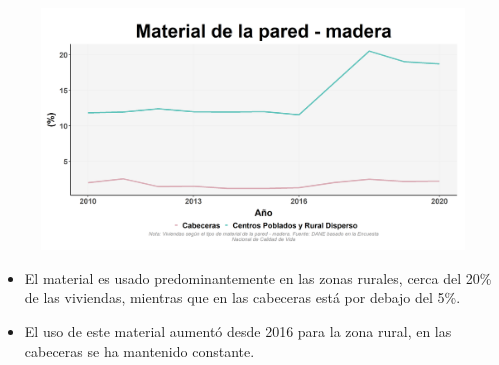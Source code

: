     \begin{figure}[H]
        \caption[Viviendas con pared de madera por zonas ]{\label{pared_madera_zonas} }
        \begin{center}
        \includegraphics[width=\textwidth,keepaspectratio]{img/var_161_trend.png}
        \end{center}
    \end{figure}
            \begin{itemize}
                    \item El material es usado predominantemente en las zonas rurales, cerca del 20\% de las viviendas, mientras que en las cabeceras está por debajo del 5\%.
                    \item El uso de este material aumentó desde 2016 para la zona rural, en las cabeceras se ha mantenido constante.
                    \end{itemize}

